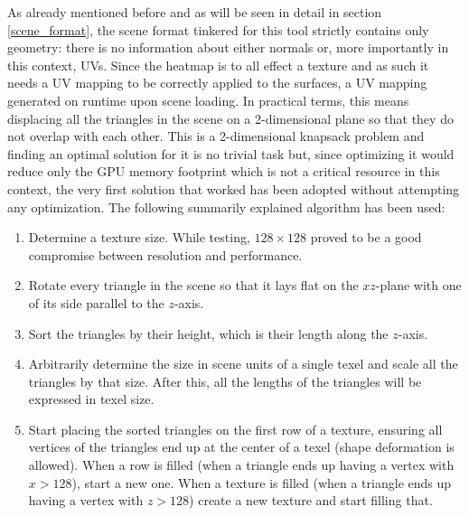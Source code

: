 As already mentioned before and as will be seen in detail in section \ref{scene_format}, the scene format tinkered for this tool strictly contains only geometry: there is no information about either normals or, more importantly in this context, UVs. Since the heatmap is to all effect a texture and as such it needs a UV mapping to be correctly applied to the surfaces, a UV mapping generated on runtime upon scene loading. In practical terms, this means displacing all the triangles in the scene on a 2-dimensional plane so that they do not overlap with each other. This is a 2-dimensional knapsack problem and finding an optimal solution for it is no trivial task but, since optimizing it would reduce only the GPU memory footprint which is not a critical resource in this context, the very first solution that worked has been adopted without attempting any optimization. The following summarily explained algorithm has been used:
\begin{enumerate}
	\item Determine a texture size. While testing, $128 \times 128$ proved to be a good compromise between resolution and performance.
	\item Rotate every triangle in the scene so that it lays flat on the $xz$-plane with one of its side parallel to the $z$-axis.
	\item Sort the triangles by their height, which is their length along the $z$-axis.
	\item Arbitrarily determine the size in scene units of a single texel and scale all the triangles by that size. After this, all the lengths of the triangles will be expressed in texel size.
	\item Start placing the sorted triangles on the first row of a texture, ensuring all vertices of the triangles end up at the center of a texel (shape deformation is allowed). When a row is filled (when a triangle ends up having a vertex with $x > 128$), start a new one. When a texture is filled (when a triangle ends up having a vertex with $z > 128$) create a new texture and start filling that.
\end{enumerate}

